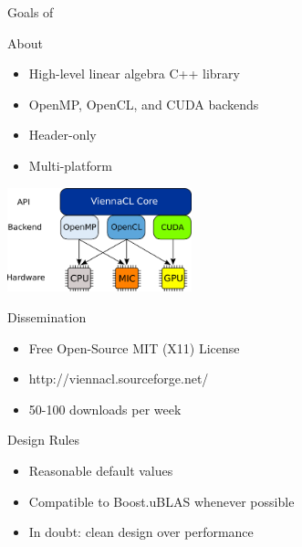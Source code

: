 \begin{frame}{Goals of \ViennaCL}

  \begin{block}{About}
   \begin{itemize}
    \item High-level linear algebra C++ library
    \item OpenMP, OpenCL, and CUDA backends
    \item Header-only
    \item Multi-platform
   \end{itemize}
  \end{block}

  \vspace*{-2.3cm}
  \begin{flushright}
   \includegraphics[width=0.4\textwidth]{figs/ViennaCL-arch.png}
  \end{flushright}

  \vspace*{-0.7cm}
  \begin{block}{Dissemination}
    \begin{itemize}
     \item Free Open-Source MIT (X11) License
     \item http://viennacl.sourceforge.net/
     \item 50-100 downloads per week
    \end{itemize}   
  \end{block}

  \begin{block}{Design Rules}
   \begin{itemize}
    \item Reasonable default values
    \item Compatible to Boost.uBLAS whenever possible 
    \item In doubt: clean design over performance
   \end{itemize}
  \end{block}

\end{frame}



